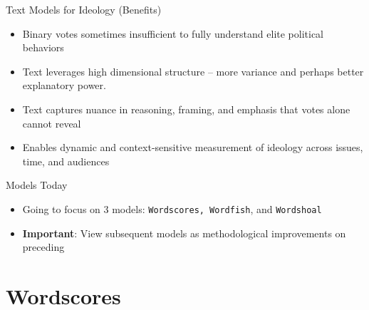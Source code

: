\documentclass[
  ignorenonframetext,
  aspectratio=169]{beamer}
\begin{document}
\begin{frame}{Text Models for Ideology (Benefits)}
\label{text-models-for-ideology-benefits}
\begin{itemize}
\item Binary votes sometimes insufficient to fully understand elite political behaviors \par \vspace{2.5mm}
\item Text leverages high dimensional structure -- more variance and perhaps better explanatory power.  \par \vspace{2.5mm}
\item Text captures nuance in reasoning, framing, and emphasis that votes alone cannot reveal \par \vspace{2.5mm}
\item Enables dynamic and context-sensitive measurement of ideology across issues, time, and audiences
\end{itemize}
\end{frame}

\begin{frame}{Models Today}
\label{models-today}
\begin{itemize}
\item Going to focus on 3 models: \texttt{Wordscores, Wordfish}, and \texttt{Wordshoal} \par \vspace{2.5mm}
\item \textbf{Important}: View subsequent models as methodological improvements on preceding \par \vspace{2.5mm}
\end{itemize}
\end{frame}

\section{Wordscores}\label{wordscores}
\end{document}

